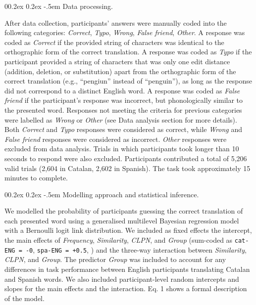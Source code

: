 \documentclass[
  man,
  longtable,
  nolmodern,
  notxfonts,
  notimes,
  colorlinks=true,linkcolor=blue,citecolor=blue,urlcolor=blue]{apa7}
\makeatletter
\renewcommand{\paragraph}{\@startsection{paragraph}{4}{\parindent}%
	{0\baselineskip \@plus 0.2ex \@minus 0.2ex}%
	{-.5em}%
	{\normalfont\normalsize\bfseries\typesectitle}}
\makeatother
\begin{document}
\paragraph{Data processing.}\label{data-processing}

After data collection, participants' answers were manually coded into
the following categories: \emph{Correct}, \emph{Typo}, \emph{Wrong},
\emph{False friend}, \emph{Other}. A response was coded as
\emph{Correct} if the provided string of characters was identical to the
orthographic form of the correct translation. A response was coded as
\emph{Typo} if the participant provided a string of characters that was
only one edit distance (addition, deletion, or substitution) apart from
the orthographic form of the correct translation (e.g., ``pengiun''
instead of ``penguin''), as long as the response did not correspond to a
distinct English word. A response was coded as \emph{False friend} if
the participant's response was incorrect, but phonologically similar to
the presented word. Responses not meeting the criteria for previous
categories were labelled as \emph{Wrong} or \emph{Other} (see Data
analysis section for more details). Both \emph{Correct} and \emph{Typo}
responses were considered as correct, while \emph{Wrong} and \emph{False
friend} responses were considered as incorrect. \emph{Other} responses
were excluded from data analysis. Trials in which participants took
longer than 10 seconds to respond were also excluded. Participants
contributed a total of 5,206 valid trials (2,604 in Catalan, 2,602 in
Spanish). The task took approximately 15 minutes to complete.

\paragraph{Modelling approach and statistical
inference.}\label{modelling-approach-and-statistical-inference}

We modelled the probability of participants guessing the correct
translation of each presented word using a generalised multilevel
Bayesian regression model with a Bernoulli logit link distribution. We
included as fixed effects the intercept, the main effects of
\emph{Frequency}, \emph{Similarity}, \emph{CLPN}, and \emph{Group}
(sum-coded as \texttt{cat-ENG\ =\ -0}, \texttt{spa-ENG\ =\ +0.5},
) and the
three-way interaction between \emph{Similarity}, \emph{CLPN}, and
\emph{Group}. The predictor \emph{Group} was included to account for any
differences in task performance between English participants translating
Catalan and Spanish words. We also included participant-level random
intercepts and slopes for the main effects and the interaction. Eq. 1
shows a formal description of the model.
\end{document}
